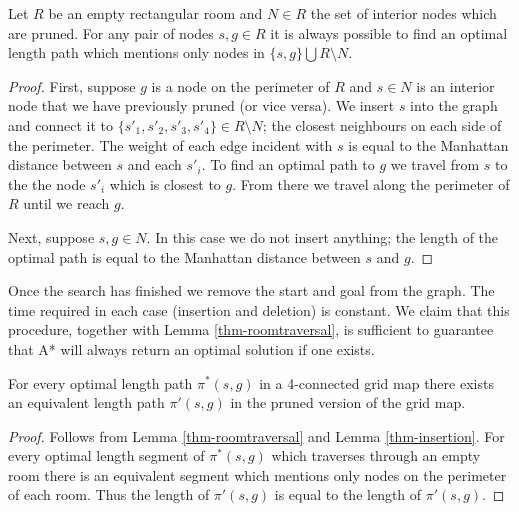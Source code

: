 \begin{lemma}
\label{thm-insertion}
Let $R$ be an empty rectangular room and $N \in R$ the set of interior nodes which are pruned.
For any pair of nodes $s, g \in R$ it is always possible to find an optimal
length path which mentions only nodes in $\lbrace s, g \rbrace \bigcup  R \setminus N$.
\end{lemma}
\begin{proof}
First, suppose $g$ is a node on the perimeter of $R$ and $s \in N$ is an interior node that we 
have previously pruned (or vice versa).
We insert $s$ into the graph and connect it to 
$\lbrace s'_{1}, s'_{2}, s'_{3}, s'_{4} \rbrace \in R \setminus N$; the closest neighbours on 
each side of the perimeter.
The weight of each edge incident with $s$ is equal to the Manhattan distance between
$s$ and each $s'_{i}$.
To find an optimal path to $g$ we travel from $s$ to the the node $s'_{i}$ which is closest
to $g$. 
From there we travel along the perimeter of $R$ until we reach $g$.
\par
Next, suppose $s, g \in N$. 
In this case we do not insert anything; the length of the optimal path is equal
to the Manhattan distance between $s$ and $g$.
\end{proof}

Once the search has finished we remove the start and goal from the graph.
The time required in each case (insertion and deletion) is constant.
We claim that this procedure, together with Lemma \ref{thm-roomtraversal}, is sufficient to 
guarantee that A* will always return an optimal solution if one exists.

\begin{theorem}
For every optimal length path $\pi^*(s, g)$ in a 4-connected grid map there exists
an equivalent length path $\pi'(s, g)$ in the pruned version of the grid map.
\end{theorem}
\begin{proof}
Follows from Lemma \ref{thm-roomtraversal} and Lemma \ref{thm-insertion}.
For every optimal length segment of $\pi^{*}(s, g)$ which traverses
through an empty room there is an equivalent segment which mentions only nodes
on the perimeter of each room. 
Thus the length of $\pi'(s, g)$ is equal to the length of $\pi'(s,g)$.
\end{proof}


